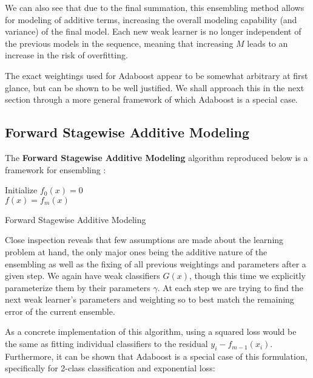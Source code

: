 \documentclass{article}
\begin{document}
We can also see that due to the final summation, this ensembling method allows for modeling of additive terms, increasing the overall modeling capability (and variance) of the final model.  Each new weak learner is no longer independent of the previous models in the sequence, meaning that increasing $M$ leads to an increase in the risk of overfitting.

The exact weightings used for Adaboost appear to be somewhat arbitrary at first glance, but can be shown to be well justified.  We shall approach this in the next section through a more general framework of which Adaboost is a special case.

\subsection{Forward Stagewise Additive Modeling}

The {\bf Forward Stagewise Additive Modeling} algorithm reproduced below is a framework for ensembling :

\begin{algorithm}[H]
\SetAlgoLined
{}
Initialize $f_0(x) = 0$\\
 $f(x) = f_m(x)$
\caption{Forward Stagewise Additive Modeling}
\end{algorithm}

Close inspection reveals that few assumptions are made about the learning problem at hand, the only major ones being the additive nature of the ensembling as well as the fixing of all previous weightings and parameters after a given step.  We again have weak classifiers $G(x)$, though this time we explicitly parameterize them by their parameters $\gamma$.  At each step we are trying to find the next weak learner's parameters and weighting so to best match the remaining error of the current ensemble.

As a concrete implementation of this algorithm, using a squared loss would be the same as fitting individual classifiers to the residual $y_i - f_{m-1}(x_i)$.  Furthermore, it can be shown that Adaboost is a special case of this formulation, specifically for 2-class classification and exponential loss:
\end{document}
